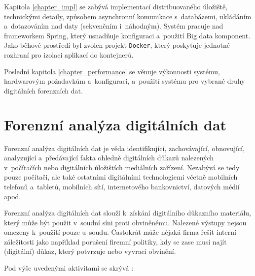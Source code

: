 Kapitola \ref{chapter_impl} se zabývá implementací distribuovaného úložiště,  technickými detaily, způsobem asynchronní komunikace s~databázemi, ukládáním a~dotazováním nad daty (sekvenčním i~náhodným). Systém pracuje nad frameworkem Spring, který usnadňuje konfiguraci a~použití Big data komponent. Jako běhové prostředí byl zvolen projekt \texttt{Docker}, který poskytuje jednotné rozhraní pro izolaci aplikací do kontejnerů.

Poslední kapitola \ref{chapter_performance} se věnuje výkonnosti systému, hardwarovým požadavkům a~konfiguraci, a~použití systému pro vybrané druhy digitálních forenzních dat.


\chapter{Forenzní analýza digitálních dat} \label{chapter1}
Forenzní analýza digitálních dat je věda identifikující, zachovávající, obnovující, analyzující a~předávající fakta ohledně digitálních důkazů nalezených v~počítačích nebo digitálních úložištích mediálních zařízení.
Nezabývá se tedy pouze počítači, ale také ostatními digitálními technologiemi včetně mobilních telefonů a~tabletů, mobilních sítí, internetového bankovnictví, datových médií apod.

Forenzní analýza digitálních dat slouží k~získání digitálního důkazního materiálu, který může být použit v~soudní síni proti obviněnému. Nalezené výstupy nejsou omezeny k~použití pouze u~soudu. Častokrát může nějaká firma řešit interní záležitosti jako například porušení firemní politiky, kdy se zase musí najít (digitální) důkaz, který potvrzuje nebo vyvrací obvinění.

Pod výše uvedenými aktivitami se skrývá \cite{whatIsDigFor}:


